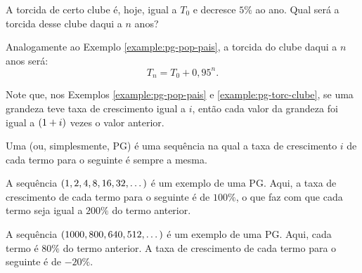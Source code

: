 \begin{example}
\label{example:pg-torc-clube}
A torcida de certo clube é, hoje, igual a $T_0$ e decresce $5\%$ ao ano. Qual será a torcida desse clube daqui a $n$ anos?
\end{example}

\begin{solution}
Analogamente ao Exemplo \ref{example:pg-pop-pais}, a torcida do clube daqui a $n$ anos será:
%
\begin{equation*}
T_n = T_0 + 0{,}95^n.
\end{equation*}
\end{solution}

\begin{remark}
Note que, nos Exemplos \ref{example:pg-pop-pais} e \ref{example:pg-torc-clube}, se uma grandeza teve taxa de crescimento igual a $i$, então cada valor da grandeza foi igual a $\left(1+i\right)$ vezes o valor anterior.
\end{remark}

\begin{definition}
Uma  (ou, simplesmente, PG) é uma sequência na qual a taxa de crescimento $i$ de cada termo para o seguinte é sempre a mesma.
\end{definition}

\begin{example}
A sequência $\left(1, 2, 4, 8, 16, 32, \dots \right)$ é um exemplo de uma PG. Aqui, a taxa de crescimento de cada termo para o seguinte é de $100 \% $, o que faz com que cada termo seja igual a $200 \% $ do termo anterior.
\end{example}

\begin{example}
A sequência $\left(1000, 800, 640, 512 , \dots \right)$ é um exemplo de uma PG. Aqui, cada termo é $80 \% $ do termo anterior. A taxa de crescimento de cada termo para o seguinte é de $ -20 \% $.
\end{example}
